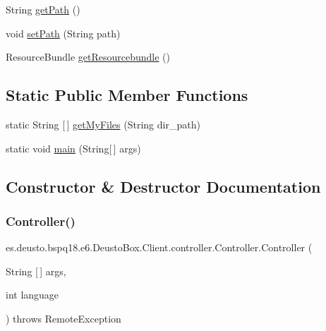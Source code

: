\begin{DoxyCompactItemize}
\item 
String \mbox{\hyperlink{classes_1_1deusto_1_1bspq18_1_1e6_1_1_deusto_box_1_1_client_1_1controller_1_1_controller_a45c70242399ca90950c7f288b2eeaee7}{get\+Path}} ()
\item 
void \mbox{\hyperlink{classes_1_1deusto_1_1bspq18_1_1e6_1_1_deusto_box_1_1_client_1_1controller_1_1_controller_ac56489e3885d063e14a9a9127fc8e318}{set\+Path}} (String path)
\item 
Resource\+Bundle \mbox{\hyperlink{classes_1_1deusto_1_1bspq18_1_1e6_1_1_deusto_box_1_1_client_1_1controller_1_1_controller_a2abd8bf652903aaaed48f52fbecefda1}{get\+Resourcebundle}} ()
\end{DoxyCompactItemize}
\subsection*{Static Public Member Functions}
\begin{DoxyCompactItemize}
\item 
static String \mbox{[}$\,$\mbox{]} \mbox{\hyperlink{classes_1_1deusto_1_1bspq18_1_1e6_1_1_deusto_box_1_1_client_1_1controller_1_1_controller_aaead61deab5f68e9ceccc66d4d7235c0}{get\+My\+Files}} (String dir\+\_\+path)
\item 
static void \mbox{\hyperlink{classes_1_1deusto_1_1bspq18_1_1e6_1_1_deusto_box_1_1_client_1_1controller_1_1_controller_ab3373e262b71eb5ad9833a2f5fbc6899}{main}} (String\mbox{[}$\,$\mbox{]} args)
\end{DoxyCompactItemize}


\subsection{Constructor \& Destructor Documentation}
\mbox{\label{classes_1_1deusto_1_1bspq18_1_1e6_1_1_deusto_box_1_1_client_1_1controller_1_1_controller_a814b3769e931ede74d3121711470eb60}} 
\subsubsection{\texorpdfstring{Controller()}{Controller()}}
{\footnotesize\ttfamily es.\+deusto.\+bspq18.\+e6.\+Deusto\+Box.\+Client.\+controller.\+Controller.\+Controller (\begin{DoxyParamCaption}\item[{String \mbox{[}$\,$\mbox{]}}]{args,  }\item[{int}]{language }\end{DoxyParamCaption}) throws Remote\+Exception}

